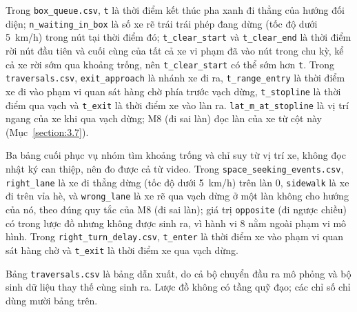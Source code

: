 \documentclass[../main.tex]{subfiles}
\begin{document}
\begin{sloppypar}
Trong \texttt{box\_queue.csv}, \texttt{t} là thời điểm kết thúc pha xanh đi thẳng của hướng đối diện; \texttt{n\_waiting\_in\_box} là số xe rẽ trái trái phép đang dừng (tốc độ dưới 5~km/h) trong nút tại thời điểm đó; \texttt{t\_clear\_start} và \texttt{t\_clear\_end} là thời điểm rời nút đầu tiên và cuối cùng của tất cả xe vi phạm đã vào nút trong chu kỳ, kể cả xe rời sớm qua khoảng trống, nên \texttt{t\_clear\_start} có thể sớm hơn \texttt{t}. Trong \texttt{traversals.csv}, \texttt{exit\_approach} là nhánh xe đi ra, \texttt{t\_range\_entry} là thời điểm xe đi vào phạm vi quan sát hàng chờ phía trước vạch dừng, \texttt{t\_stopline} là thời điểm qua vạch và \texttt{t\_exit} là thời điểm xe vào làn ra. \texttt{lat\_m\_at\_stopline} là vị trí ngang của xe khi qua vạch dừng; M8 (đi sai làn) đọc làn của xe từ cột này (Mục~\ref{section:3.7}).
\end{sloppypar}

\begin{sloppypar}
Ba bảng cuối phục vụ nhóm tìm khoảng trống và chỉ suy từ vị trí xe, không đọc nhật ký can thiệp, nên đo được cả từ video. Trong \texttt{space\_seeking\_events.csv}, \texttt{right\_lane} là xe đi thẳng dừng (tốc độ dưới 5~km/h) trên làn 0, \texttt{sidewalk} là xe đi trên vỉa hè, và \texttt{wrong\_lane} là xe rẽ qua vạch dừng ở một làn không cho hướng của nó, theo đúng quy tắc của M8 (đi sai làn); giá trị \texttt{opposite} (đi ngược chiều) có trong lược đồ nhưng không được sinh ra, vì hành vi 8 nằm ngoài phạm vi mô hình. Trong \texttt{right\_turn\_delay.csv}, \texttt{t\_enter} là thời điểm xe vào phạm vi quan sát hàng chờ và \texttt{t\_exit} là thời điểm xe qua vạch dừng.
\end{sloppypar}

\begin{sloppypar}
Bảng \texttt{traversals.csv} là bảng dẫn xuất, do cả bộ chuyển đầu ra mô phỏng và bộ sinh dữ liệu thay thế cùng sinh ra. Lược đồ không có tầng quỹ đạo; các chỉ số chỉ dùng mười bảng trên.
\end{sloppypar}
\end{document}
